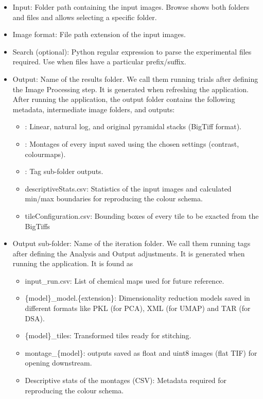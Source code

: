 	\begin{itemize}
		
		\item Input: Folder path containing the input images. Browse shows both folders and files and allows selecting a specific folder.
		\item Image format: File path extension of the input images.
		\item Search (optional): Python regular expression to parse the experimental files required. Use when files have a particular prefix/suffix.
		\item Output: Name of the results folder. We call them running trials after defining the Image Processing step. It is generated when refreshing the application. After running the application, the output folder contains the following metadata, intermediate image folders, and outputs:
			\begin{itemize}
				\item {}: Linear, natural log, and original pyramidal stacks (BigTiff format). 
				\item {}: Montages of every input saved using the chosen settings (contrast, colourmaps).
				\item {}: Tag sub-folder outputs.
				\item descriptiveStats.csv: Statistics of the input images and calculated min/max boundaries for reproducing the colour schema.
				\item tileConfiguration.csv: Bounding boxes of every tile to be exacted from the BigTiffs
			\end{itemize}
			
		\item Output sub-folder: Name of the iteration folder. We call them running tags after defining the Analysis and Output adjustments. It is generated when running the application. It is found as 
			\begin{itemize}                
				\item \textcolor{MyBlue}{input\_run.csv}: List of chemical maps used for future reference.
				\item \textcolor{MyBlue}{\{model\}\_model.\{extension\}}: Dimensionality reduction models saved in different formats like PKL (for PCA), XML (for UMAP) and TAR (for DSA).
				\item \textcolor{MyBlue}{\{model\}\_tiles}: Transformed tiles ready for stitching.
				\item \textcolor{MyBlue}{montage\_\{model\}}: outputs saved as float and uint8 images (flat TIF) for opening downstream.
				\item \textcolor{MyBlue}{Descriptive stats of the montages (CSV)}: Metadata required for reproducing the colour schema.
			\end{itemize}
			
	\end{itemize}
	
